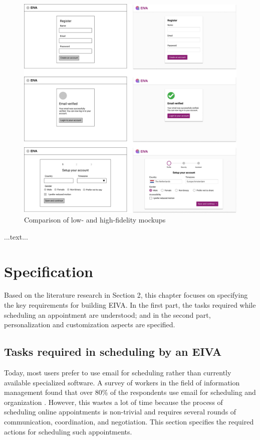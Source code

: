 \documentclass{article}
\begin{document}
\begin{figure}
	\includegraphics[width=\textwidth]{mockup-1.png}
	\caption{Comparison of low- and high-fidelity mockups}
\end{figure}

...text...

\newpage

\section{Specification}

Based on the literature research in Section 2, this chapter focuses on specifying the key requirements for building EIVA. In the first part, the tasks required while scheduling an appointment are understood; and in the second part, personalization and customization aspects are specified.

\subsection{Tasks required in scheduling by an EIVA}

Today, most users prefer to use email for scheduling rather than currently available specialized software. A survey of workers in the field of information management found that over 80\% of the respondents use email for scheduling and organization \cite{ducheneaut_e-mail_2001}. However, this wastes a lot of time because the process of scheduling online appointments is non-trivial and requires several rounds of communication, coordination, and negotiation. This section specifies the required actions for scheduling such appointments.
\end{document}
